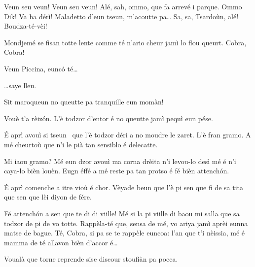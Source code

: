 \begin{drama}

\Sahlammspeaks Veun seu veun! Veun seu veun! Alé, sah, ommo, que fa arrevé i parque. Ommo Dik! Va ba dérì! Maladetto d'eun tseun, m'acoutte pa\ldots 
Sa, sa, Tsardoùn, alé! Boudza-té-vèi!


\Sahlammspeaks Mondjemé se fisan totte lente comme té n’ario cheur jamì lo flou queurt. Cobra, Cobra!


\Sahlammspeaks Veun Piccina, eunc\'o té\ldots


\Sahlammspeaks \ldots saye lleu.


\Piccinaspeaks Sit maroqueun no queutte pa tranquille eun momàn!

\Cobraspeaks  Vouè t’a rèiz\'on. L’è todzor d’entor é no queutte jamì pequì eun pése.

\Tzardounspeaks \'E aprì avouì si tseun \cane\ que l’è todzor dérì a no moudre le zaret. L’è fran gramo. A mé cheurtoù que n’i le pià tan sensiblo é delecatte.

\Cobraspeaks Mi iaou gramo? Mé eun dzor avouì ma corna drèita n’i levou-lo desì mé é n'i caya-lo bièn louèn.  Eugn éffé a mé reste pa tan protso é fé bièn attench\'on.

\Piccinaspeaks \'E aprì comenche a itre vioù é chor. Vèyade beun que l’è pi sen que fi de sa tita que sen que lèi diyon de fére.

\Tzardounspeaks Fé attench\'on a sen que te di di viille! Mé si la pi viille di baou mi salla que sa todzor de pi de vo totte. Rappèla-té que, sensa de mé, vo ariya jamì aprèi eunna matse de bague. Té, Cobra, si pa se te rappèle euncoa: l’an que t’i nèissia, mé é mamma de té allavon bièn d’accor é\ldots

\Cobraspeaks Voualà que torne reprende sise discour stoufiàn pa pocca.


\end{drama}
